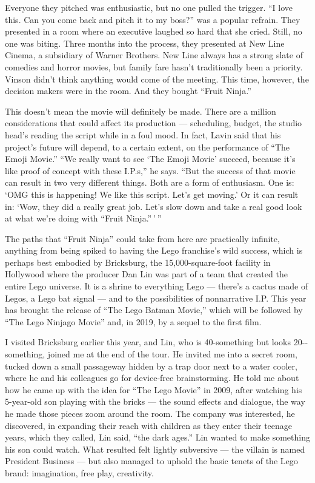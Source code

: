 Everyone they pitched was enthusiastic, but no one pulled the trigger.
``I love this. Can you come back and pitch it to my boss?'' was a
popular refrain. They presented in a room where an executive laughed so
hard that she cried. Still, no one was biting. Three months into the
process, they presented at New Line Cinema, a subsidiary of Warner
Brothers. New Line always has a strong slate of comedies and horror
movies, but family fare hasn't traditionally been a priority. Vinson
didn't think anything would come of the meeting. This time, however, the
decision makers were in the room. And they bought ``Fruit Ninja.''

This doesn't mean the movie will definitely be made. There are a million
considerations that could affect its production --- scheduling, budget,
the studio head's reading the script while in a foul mood. In fact,
Lavin said that his project's future will depend, to a certain extent,
on the performance of ``The Emoji Movie.'' ``We really want to see `The
Emoji Movie' succeed, because it's like proof of concept with these
I.P.s,'' he says. ``But the success of that movie can result in two very
different things. Both are a form of enthusiasm. One is: `OMG this is
happening! We like this script. Let's get moving.' Or it can result in:
`Wow, they did a really great job. Let's slow down and take a real good
look at what we're doing with ``Fruit Ninja.'' ' ''

The paths that ``Fruit Ninja'' could take from here are practically
infinite, anything from being spiked to having the Lego franchise's wild
success, which is perhaps best embodied by Bricksburg, the
15,000-­square-­foot facility in Hollywood where the producer Dan Lin
was part of a team that created the entire Lego universe. It is a shrine
to everything Lego --- there's a cactus made of Legos, a Lego bat signal
--- and to the possibilities of non­narrative I.P. This year has brought
the release of ``The Lego Batman Movie,'' which will be followed by
``The Lego Ninjago Movie'' and, in 2019, by a sequel to the first film.

I visited Bricksburg earlier this year, and Lin, who is 40-­something
but looks 20-­something, joined me at the end of the tour. He invited me
into a secret room, tucked down a small passageway hidden by a trap door
next to a water cooler, where he and his colleagues go for device-­free
brainstorming. He told me about how he came up with the idea for ``The
Lego Movie'' in 2009, after watching his 5-year-old son playing with the
bricks --- the sound effects and dialogue, the way he made those pieces
zoom around the room. The company was interested, he discovered, in
expanding their reach with children as they enter their teenage years,
which they called, Lin said, ``the dark ages.'' Lin wanted to make
something his son could watch. What resulted felt lightly subversive ---
the villain is named President Business --- but also managed to uphold
the basic tenets of the Lego brand: imagination, free play, creativity.

